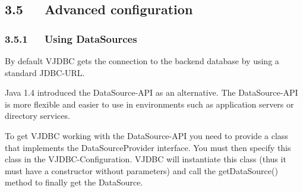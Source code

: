 \documentclass[10pt,a4paper,english]{article}
\begin{document}

\hypertarget{advanced-configuration}{}
\subsection*{3.5~~~Advanced configuration}



\hypertarget{using-datasources}{}
\subsubsection*{3.5.1~~~Using DataSources}

By default VJDBC gets the connection to the backend database by using a standard JDBC-URL.

Java 1.4 introduced the DataSource-API as an alternative. The DataSource-API is more flexible and easier to use in environments such as application servers or directory services.

To get VJDBC working with the DataSource-API you need to provide a class that implements the DataSourceProvider interface. You must then specify this class in the VJDBC-Configuration. VJDBC will instantiate this class (thus it must have a constructor without parameters) and call the getDataSource() method to finally get the DataSource.
\end{document}

